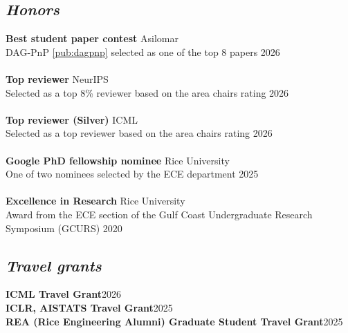 \documentclass[a4paper,9pt]{extarticle}
\begin{document}
\subsection*{\textit{Honors}}
\textbf{Best student paper contest}  \hfill Asilomar\\
DAG-PnP \ref{pub:dagpnp} selected as one of the top 8 papers \hfill  2026\\ \\
\textbf{Top reviewer}  \hfill NeurIPS\\
Selected as a top 8\% reviewer based on the area chairs rating \hfill  2026\\ \\
\textbf{Top reviewer (Silver)}  \hfill ICML\\
Selected as a top reviewer based on the area chairs rating \hfill  2026\\ \\
\textbf{Google PhD fellowship nominee}  \hfill Rice University\\
One of two nominees selected by the ECE department \hfill 2025\\ \\
\textbf{Excellence in Research}  \hfill Rice University\\ 
Award from the ECE section of the Gulf Coast Undergraduate Research Symposium (GCURS) \hfill 2020

\subsection*{\textit{Travel grants}}
\textbf{ICML Travel Grant}\hfill 2026\\
\textbf{ICLR, AISTATS Travel Grant}\hfill 2025\\
\textbf{REA (Rice Engineering Alumni) Graduate Student Travel Grant}\hfill 2025\\
\end{document}
